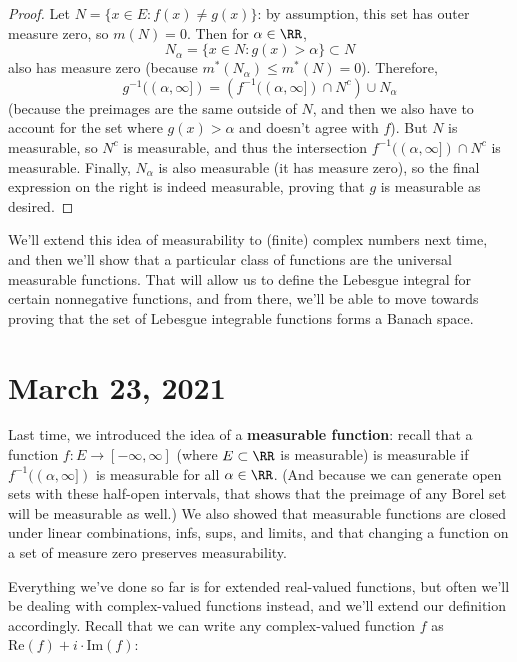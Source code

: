 \begin{proof}
Let $N = \{x \in E: f(x) \ne g(x)\}$: by assumption, this set has outer measure zero, so $m(N) = 0$. Then for $\alpha \in \RR$, 
\[
    N_{\alpha} = \{x \in N: g(x) > \alpha\} \subset N
\]
also has measure zero (because $m^\ast(N_\alpha) \le m^\ast(N) = 0$). Therefore, 
\[
    g^{-1}((\alpha, \infty]) = \left(f^{-1}((\alpha, \infty]) \cap N^c\right) \cup N_\alpha
\]
(because the preimages are the same outside of $N$, and then we also have to account for the set where $g(x) > \alpha$ and doesn't agree with $f$). But $N$ is measurable, so $N^c$ is measurable, and thus the intersection $f^{-1}((\alpha, \infty]) \cap N^c$ is measurable. Finally, $N_\alpha$ is also measurable (it has measure zero), so the final expression on the right is indeed measurable, proving that $g$ is measurable as desired.
\end{proof}

We'll extend this idea of measurability to (finite) complex numbers next time, and then we'll show that a particular class of functions are the universal measurable functions. That will allow us to define the Lebesgue integral for certain nonnegative functions, and from there, we'll be able to move towards proving that the set of Lebesgue integrable functions forms a Banach space.


\pagebreak\section*{March 23, 2021}

Last time, we introduced the idea of a \textbf{measurable function}: recall that a function $f: E \to [-\infty, \infty]$ (where $E \subset \RR$ is measurable) is measurable if $f^{-1}((\alpha, \infty])$ is measurable for all $\alpha \in \RR$. (And because we can generate open sets with these half-open intervals, that shows that the preimage of any Borel set will be measurable as well.) We also showed that measurable functions are closed under linear combinations, infs, sups, and limits, and that changing a function on a set of measure zero preserves measurability.

Everything we've done so far is for extended real-valued functions, but often we'll be dealing with complex-valued functions instead, and we'll extend our definition accordingly. Recall that we can write any complex-valued function $f$ as $\text{Re}(f) + i \cdot \text{Im}(f)$:

